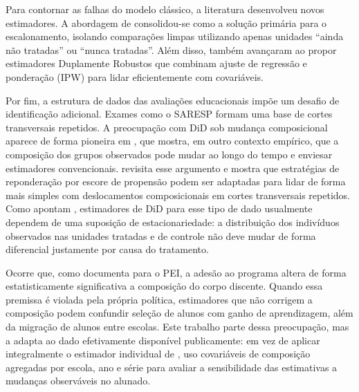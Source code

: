 Para contornar as falhas do modelo clássico, a literatura desenvolveu novos estimadores. A abordagem de \textcite{callawaysantanna} consolidou-se como a solução primária para o escalonamento, isolando comparações limpas utilizando apenas unidades ``ainda não tratadas'' ou ``nunca tratadas''. Além disso, \textcite{santannazhao} também avançaram ao propor estimadores Duplamente Robustos que combinam ajuste de regressão e ponderação (IPW) para lidar eficientemente com covariáveis.

Por fim, a estrutura de dados das avaliações educacionais impõe um desafio de identificação adicional. Exames como o SARESP formam uma base de cortes transversais repetidos. A preocupação com DiD sob mudança composicional aparece de forma pioneira em \textcite{hong2013}, que mostra, em outro contexto empírico, que a composição dos grupos observados pode mudar ao longo do tempo e enviesar estimadores convencionais. \textcite{murto2024} revisita esse argumento e mostra que estratégias de reponderação por escore de propensão podem ser adaptadas para lidar de forma mais simples com deslocamentos composicionais em cortes transversais repetidos. Como apontam \textcite{santannaxu}, estimadores de DiD para esse tipo de dado usualmente dependem de uma suposição de estacionariedade: a distribuição dos indivíduos observados nas unidades tratadas e de controle não deve mudar de forma diferencial justamente por causa do tratamento. 

Ocorre que, como \textcite{favaro_composicao_pei} documenta para o PEI, a adesão ao programa altera de forma estatisticamente significativa a composição do corpo discente. Quando essa premissa é violada pela própria política, estimadores que não corrigem a composição podem confundir seleção de alunos com ganho de aprendizagem, além da migração de alunos entre escolas. Este trabalho parte dessa preocupação, mas a adapta ao dado efetivamente disponível publicamente: em vez de aplicar integralmente o estimador individual de \textcite{santannaxu}, uso covariáveis de composição agregadas por escola, ano e série para avaliar a sensibilidade das estimativas a mudanças observáveis no alunado.